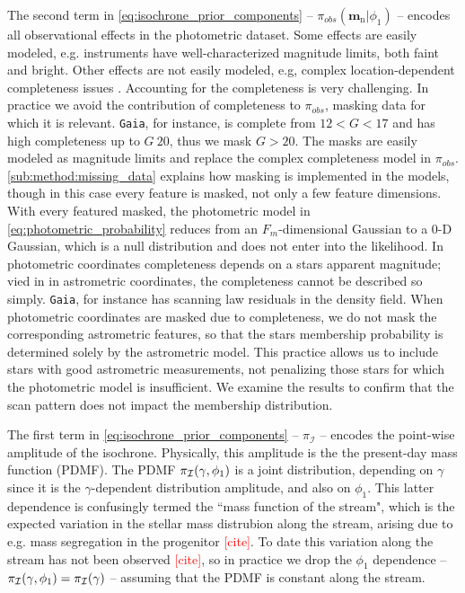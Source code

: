 \documentclass[twocolumn]{aastex631}
\newcommand{\dataarchive}[1]{\texttt{#1}}
\newcommand{\Gaia}{\dataarchive{Gaia}}
\newcommand{\mrm}[1]{\mathrm{#1}}
\newcommand{\mbs}[1]{\boldsymbol{#1}}
\newcommand{\mcal}[1]{\mathcal{#1}}
\newcommand{\prior}{\mcal{\pi}}
\newcommand{\nth}[1]{{#1}_{\mrm{n}}}  %
\newcommand{\TODO}[1]{{\textcolor{red}{#1}}}
\begin{document}
            The second term in \autoref{eq:isochrone_prior_components} --
            $\prior_{obs}(\nth{\mbs{m}} | \phi_1)$ -- encodes all observational
            effects in the photometric dataset. Some effects are easily modeled,
            e.g. instruments have well-characterized magnitude limits, both
            faint and bright. Other effects are not easily modeled, e.g, complex
            location-dependent completeness issues \citep{GaiaCompleteness}.
            Accounting for the completeness is very challenging. In practice we
            avoid the contribution of completeness to $\prior_{obs}$, masking
            data for which it is relevant. \Gaia, for instance, is complete from
            $12 < G < 17$ and has high completeness up to $G ~20$, thus we mask
            $G > 20$.  The masks are easily modeled as magnitude limits and
            replace the complex completeness model in $\prior_{obs}$.
            \autoref{sub:method:missing_data} explains how masking is
            implemented in the models, though in this case every feature is
            masked, not only a few feature dimensions. With every featured
            masked, the photometric model in
            \autoref{eq:photometric_probability} reduces from an
            $F_m$-dimensional Gaussian to a 0-D Gaussian, which is a null
            distribution and does not enter into the likelihood.  In photometric
            coordinates completeness depends on a stars apparent magnitude; vied
            in in astrometric coordinates, the completeness cannot be described
            so simply. \Gaia, for instance has scanning law residuals in the
            density field. When photometric coordinates are masked due to
            completeness, we do not mask the corresponding  astrometric
            features, so that the stars  membership probability is determined
            solely by the astrometric model. This practice allows us to include
            stars with good astrometric measurements, not penalizing those stars
            for which the photometric model is insufficient.  We examine the
            results to confirm that the scan pattern does not impact the
            membership distribution.

            The first term in \autoref{eq:isochrone_prior_components} --
            $\prior_{\mcal{I}}$ -- encodes the point-wise amplitude of the
            isochrone.  Physically, this amplitude is the the present-day mass
            function (PDMF). The PDMF $\prior_{\cal{I}}(\gamma, \phi_1)$ is a
            joint distribution, depending on $\gamma$ since it is the
            $\gamma$-dependent distribution amplitude, and also on $\phi_1$.
            This latter dependence is confusingly termed the ``mass function of
            the stream", which is the expected variation in the stellar mass
            distrubion along the stream, arising due to e.g. mass segregation in
            the progenitor \TODO{[cite]}. To date this variation along the
            stream has not been observed \TODO{[cite]}, so in practice we drop
            the $\phi_1$ dependence -- $\prior_{\cal{I}}(\gamma, \phi_1) =
            \prior_{\cal{I}}(\gamma)$ -- assuming that the PDMF is constant
            along the stream.
\end{document}
